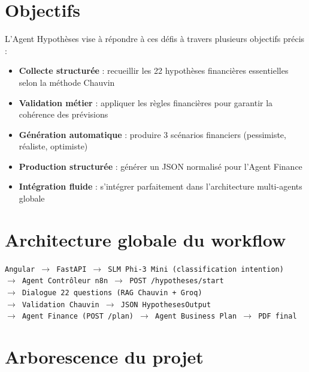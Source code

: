 \documentclass[12pt, a4paper]{report}
\begin{document}
\section{Objectifs}

L'Agent Hypothèses vise à répondre à ces défis à travers plusieurs objectifs précis :

\begin{itemize}
  \item \textbf{Collecte structurée} : recueillir les 22 hypothèses financières essentielles selon la méthode Chauvin
  \item \textbf{Validation métier} : appliquer les règles financières pour garantir la cohérence des prévisions
  \item \textbf{Génération automatique} : produire 3 scénarios financiers (pessimiste, réaliste, optimiste)
  \item \textbf{Production structurée} : générer un JSON normalisé pour l'Agent Finance
  \item \textbf{Intégration fluide} : s'intégrer parfaitement dans l'architecture multi-agents globale
\end{itemize}

\section{Architecture globale du workflow}

\begin{formulebox}[title={\bfseries\color{navyblue} Workflow de la plateforme}]
\texttt{Angular $\rightarrow$ FastAPI $\rightarrow$ SLM Phi-3 Mini (classification intention)}\\
\texttt{$\rightarrow$ Agent Contrôleur n8n $\rightarrow$ POST /hypotheses/start}\\
\texttt{$\rightarrow$ Dialogue 22 questions (RAG Chauvin + Groq)}\\
\texttt{$\rightarrow$ Validation Chauvin $\rightarrow$ JSON HypothesesOutput}\\
\texttt{$\rightarrow$ Agent Finance (POST /plan) $\rightarrow$ Agent Business Plan $\rightarrow$ PDF final}
\end{formulebox}

\section{Arborescence du projet}
\end{document}
